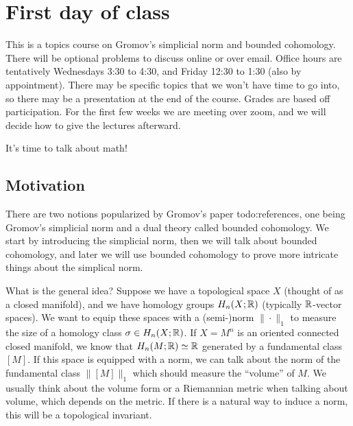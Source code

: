 \section{First day of class}
This is a topics course on Gromov's simplicial norm and bounded cohomology. There will be optional problems to discuss online or over email. Office hours are tentatively Wednesdays 3:30 to 4:30, and Friday 12:30 to 1:30 (also by appointment). There may be specific topics that we won't have time to go into, so there may be a presentation at the end of the course. Grades are based off participation. For the first few weeks we are meeting over zoom, and we will decide how to give the lectures afterward.

It's time to talk about math!

\subsection{Motivation}
There are two notions popularized by Gromov's paper {\color{red}todo:references}, one being Gromov's simplicial norm and a dual theory called bounded cohomology. We start by introducing the simplicial norm, then we will talk about bounded cohomology, and later we will use bounded cohomology to prove more intricate things about the simplical norm.

What is the general idea? Suppose we have a topological space $X$ (thought of as a closed manifold), and we have homology groups $H_n (X;\mathbb{R})$ (typically $\mathbb{R}$-vector spaces). We want to equip these spaces with a (semi-)norm $\|\cdot \|_1$ to measure the size of a homology class $\sigma \in H_n (X; \mathbb{R})$. If $X=M^n $ is an oriented connected closed manifold, we know that $H_n (M ;\mathbb{R}) \simeq \mathbb{R}$ generated by a fundamental class $[M]$. If this space is equipped with a norm, we can talk about the norm of the fundamental class $\| [M ]\|_1$ which should measure the ``volume'' of $M$. We usually think about the volume form or a Riemannian metric when talking about volume, which depends on the metric. If there is a natural way to induce a norm, this will be a topological invariant.

